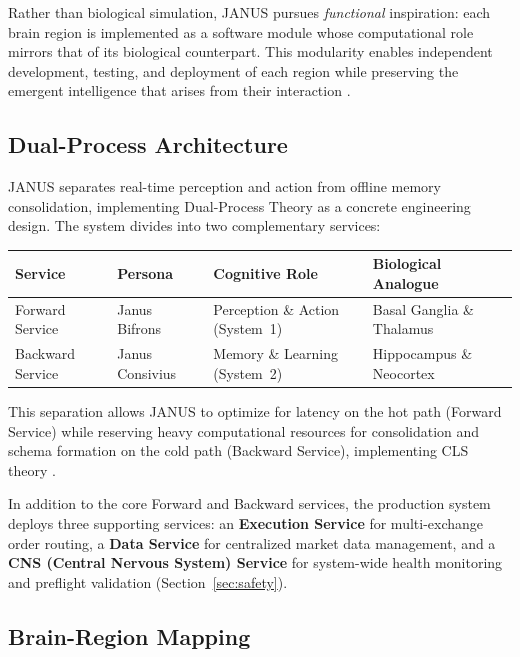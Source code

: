 \documentclass[12pt, a4paper]{article}
\begin{document}
Rather than biological simulation, JANUS pursues \textit{functional} inspiration: each brain region is implemented as a software module whose computational role mirrors that of its biological counterpart. This modularity enables independent development, testing, and deployment of each region while preserving the emergent intelligence that arises from their interaction \citep{caligiore2019superlearning}.

\subsection{Dual-Process Architecture}
\label{sec:dual_process}

JANUS separates real-time perception and action from offline memory consolidation, implementing Dual-Process Theory \citep{kahneman2011thinking, evans2008dual, evans2013dualprocess} as a concrete engineering design. The system divides into two complementary services:

\begin{table}[htbp]
	\centering
	\begin{tabularx}{\textwidth}{|l|l|L|L|}
		\hline
		\textbf{Service} & \textbf{Persona} & \textbf{Cognitive Role}         & \textbf{Biological Analogue} \\
		\hline
		Forward Service  & Janus Bifrons    & Perception \& Action (System~1) & Basal Ganglia \& Thalamus    \\
		Backward Service & Janus Consivius  & Memory \& Learning (System~2)   & Hippocampus \& Neocortex     \\
		\hline
	\end{tabularx}
\end{table}

This separation allows JANUS to optimize for latency on the hot path (Forward Service) while reserving heavy computational resources for consolidation and schema formation on the cold path (Backward Service), implementing CLS theory \citep{mcclelland1995complementary, kumaran2016cls}.

In addition to the core Forward and Backward services, the production system deploys three supporting services: an \textbf{Execution Service} for multi-exchange order routing, a \textbf{Data Service} for centralized market data management, and a \textbf{CNS (Central Nervous System) Service} for system-wide health monitoring and preflight validation (Section~\ref{sec:safety}).

\subsection{Brain-Region Mapping}
\label{sec:brain_mapping}
\end{document}
